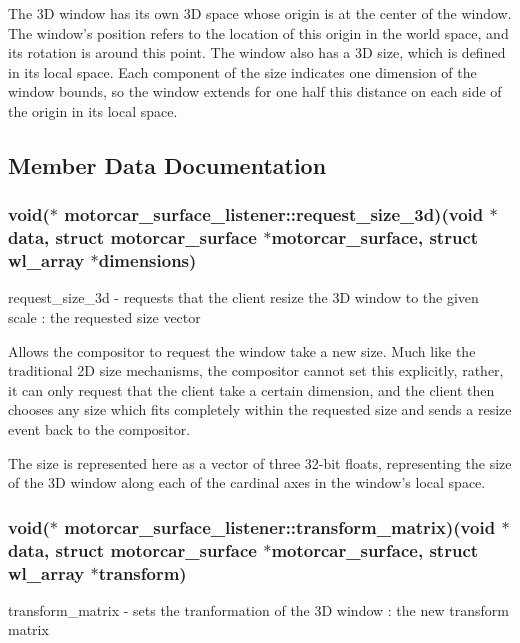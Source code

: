 The 3\-D window has its own 3\-D space whose origin is at the center of the window. The window's position refers to the location of this origin in the world space, and its rotation is around this point. The window also has a 3\-D size, which is defined in its local space. Each component of the size indicates one dimension of the window bounds, so the window extends for one half this distance on each side of the origin in its local space. 

\subsection{Member Data Documentation}
\hypertarget{structmotorcar__surface__listener_aaf93856b0517537beddea51838634496}{
\subsubsection[{request\-\_\-size\-\_\-3d}]{\setlength{\rightskip}{0pt plus 5cm}void($\ast$ motorcar\-\_\-surface\-\_\-listener\-::request\-\_\-size\-\_\-3d)(void $\ast$data, struct motorcar\-\_\-surface $\ast$motorcar\-\_\-surface, struct wl\-\_\-array $\ast$dimensions)}}\label{structmotorcar__surface__listener_aaf93856b0517537beddea51838634496}
request\-\_\-size\-\_\-3d -\/ requests that the client resize the 3\-D window to the given scale \-: the requested size vector

Allows the compositor to request the window take a new size. Much like the traditional 2\-D size mechanisms, the compositor cannot set this explicitly, rather, it can only request that the client take a certain dimension, and the client then chooses any size which fits completely within the requested size and sends a resize event back to the compositor.

The size is represented here as a vector of three 32-\/bit floats, representing the size of the 3\-D window along each of the cardinal axes in the window's local space. \hypertarget{structmotorcar__surface__listener_af82c86b66c3207618e167315173d757c}{
\subsubsection[{transform\-\_\-matrix}]{\setlength{\rightskip}{0pt plus 5cm}void($\ast$ motorcar\-\_\-surface\-\_\-listener\-::transform\-\_\-matrix)(void $\ast$data, struct motorcar\-\_\-surface $\ast$motorcar\-\_\-surface, struct wl\-\_\-array $\ast$transform)}}\label{structmotorcar__surface__listener_af82c86b66c3207618e167315173d757c}
transform\-\_\-matrix -\/ sets the tranformation of the 3\-D window \-: the new transform matrix

